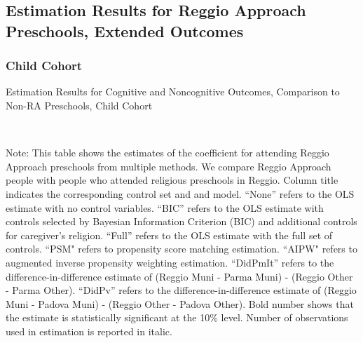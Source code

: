 \subsection{Estimation Results for Reggio Approach Preschools, Extended Outcomes} 
\subsubsection{Child Cohort}
\begin{table}[H] \caption{Estimation Results for Cognitive and Noncognitive Outcomes, Comparison to Non-RA Preschools, Child Cohort} \label{ols-CN-child-reg-reli}
\scalebox{0.8}{}
\vspace{1ex} \\
\footnotesize\raggedright{Note: This table shows the estimates of the coefficient for attending Reggio Approach preschools from multiple methods. We compare Reggio Approach people with people who attended religious preschools in Reggio. Column title indicates the corresponding control set and and model. ``None'' refers to the OLS estimate with no control variables. ``BIC'' refers to the OLS estimate with controls selected by Bayesian Information Criterion (BIC) and additional controls for caregiver's religion. ``Full'' refers to the OLS estimate with the full set of controls. ``PSM" refers to propensity score matching estimation. ``AIPW" refers to augmented inverse propensity weighting estimation. ``DidPmIt'' refers to the difference-in-difference estimate of (Reggio Muni - Parma Muni) - (Reggio Other - Parma Other). ``DidPv'' refers to the difference-in-difference estimate of (Reggio Muni - Padova Muni) - (Reggio Other - Padova Other). Bold number shows that the estimate is statistically significant at the 10\% level. Number of observations used in estimation is reported in italic.}
\end{table}


